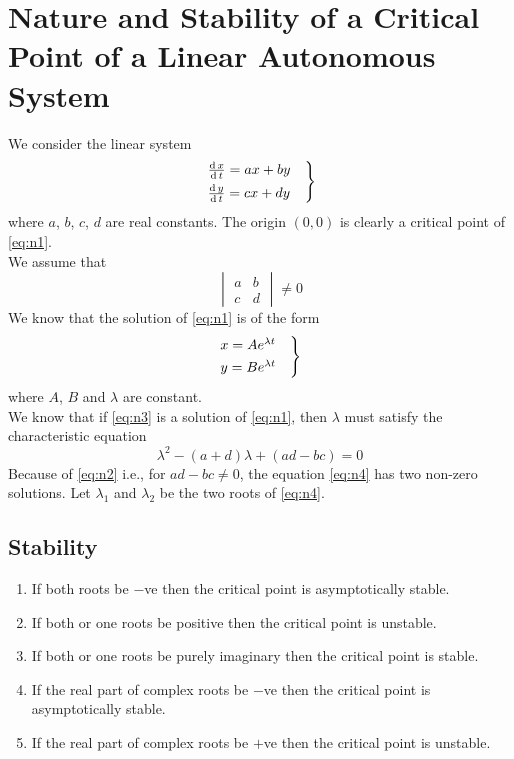 \documentclass[../main-sheet.tex]{subfiles}
\begin{document}
\section{Nature and Stability of a Critical Point of a Linear Autonomous System}
We consider the linear system
\begin{equation}
    \begin{rcases}
        \,\frac{\mathrm{d}\,x}{\mathrm{d}\,t}=ax+by\quad\\
        \,\frac{\mathrm{d}\,y}{\mathrm{d}\,t}=cx+dy    
    \end{rcases}
    \label{eq:n1}
\end{equation}
where \(a\), \(b\), \(c\), \(d\) are real constants. The origin \((0,0)\) is clearly a critical point of \eqref{eq:n1}.\\
We assume that 
\begin{equation}
    \begin{vmatrix}
        a&b\\
        c&d
    \end{vmatrix}\neq 0 \label{eq:n2}
\end{equation}
We know that the solution of \eqref{eq:n1} is of the form
\begin{equation}
    \begin{rcases}
        {x}=Ae^{\lambda t}\quad\\
        {y}=Be^{\lambda t}
    \end{rcases}
    \label{eq:n3}
\end{equation}
where \(A\), \(B\) and \(\lambda\) are constant.\\
We know that if \eqref{eq:n3} is a solution of \eqref{eq:n1}, then \(\lambda\) must satisfy the characteristic equation
\begin{equation}
    \lambda^2-(a+d)\lambda+(ad-bc)=0\label{eq:n4}
\end{equation}
Because of \eqref{eq:n2} i.e., for \(ad-bc\neq 0\), the equation \eqref{eq:n4} has two non-zero solutions. Let \(\lambda_1\) and \(\lambda_2\) be the two roots of \eqref{eq:n4}.
\subsection{Stability}
\begin{enumerate}[label=(\roman*)]
    \item If both roots be \(-\)ve then the critical point is asymptotically stable.
    \item If both or one roots be positive then the critical point is unstable.
    \item If both or one roots be purely imaginary then the critical point is stable.
    \item If the real part of complex roots be \(-\)ve then the critical point is asymptotically stable.
    \item If the real part of complex roots be \(+\)ve then the critical point is unstable.
\end{enumerate}
\end{document}
